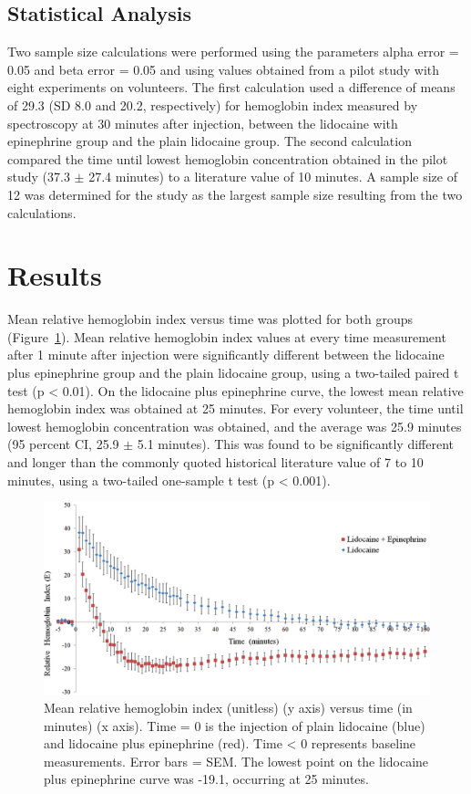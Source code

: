 \subsection{Statistical Analysis}
Two sample size calculations were performed using the parameters alpha error = 0.05 and beta error = 0.05 and using values obtained from a pilot study with eight experiments on volunteers. The first calculation used a difference of means of 29.3 (SD 8.0 and 20.2, respectively) for hemoglobin index measured by spectroscopy at 30 minutes after injection, between the lidocaine with epinephrine group and the plain lidocaine group. The second calculation compared the time until lowest hemoglobin concentration obtained in the pilot study (37.3 $\pm$ 27.4 minutes) to a literature value of 10 minutes. A sample size of 12 was determined for the study as the largest sample size resulting from the two calculations.

\section{Results}
Mean relative hemoglobin index versus time was plotted for both groups (Figure~\ref{fig:p2-mckee_fig}). Mean relative hemoglobin index values at every time measurement after 1 minute after injection were significantly different between the lidocaine plus epinephrine group and the plain lidocaine group, using a two-tailed paired t test (p < 0.01). On the lidocaine plus epinephrine curve, the lowest mean relative hemoglobin index was obtained at 25 minutes. For every volunteer, the time until lowest hemoglobin concentration was obtained, and the average was 25.9 minutes (95 percent CI, 25.9 $\pm$ 5.1 minutes). This was found to be significantly different and longer than the commonly quoted historical literature value of 7 to 10 minutes, using a two-tailed one-sample t test (p < 0.001).

\begin{figure}
	\centering \includegraphics[width=1.0\textwidth]{figures/p2-mckee_fig.png}
	\caption[Sample time course of lidocaine and epinephrine]{\label{fig:p2-mckee_fig} Mean relative hemoglobin index (unitless) (y axis) versus time (in minutes) (x axis). Time = 0 is the injection of plain lidocaine (blue) and lidocaine plus epinephrine (red). Time < 0 represents baseline measurements. Error bars = SEM. The lowest point on the lidocaine plus epinephrine curve was -19.1, occurring at 25 minutes.}
\end{figure}

